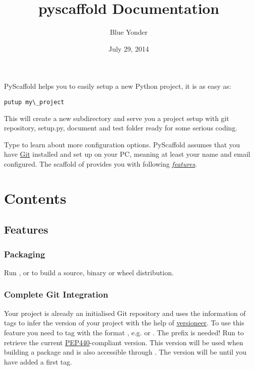 \documentclass[letterpaper,10pt,english]{sphinxmanual}
\title{pyscaffold Documentation}
\date{July 29, 2014}
\author{Blue Yonder}
\begin{document}
\maketitle
\tableofcontents
{}\label{index::doc}


PyScaffold helps you to easily setup a new Python project, it is as easy as:

\begin{Verbatim}[commandchars=\\\{\}]
putup my\_project
\end{Verbatim}

This will create a new subdirectory  and serve you a project
setup with git repository, setup.py, document and test folder ready for some
serious coding.

Type  to learn about more configuration options. PyScaffold assumes
that you have \href{http://git-scm.com/}{Git} installed and set up on your PC,
meaning at least your name and email configured.
The scaffold of  provides you with following
{\hyperref[features:features]{\emph{features}}}.


\chapter{Contents}
\label{index:pyscaffold}\label{index:contents}

\section{Features}
\label{features::doc}\label{features:features}\label{features:id1}

\subsection{Packaging}
\label{features:packaging}
Run ,  or
 to build a source, binary or wheel
distribution.


\subsection{Complete Git Integration}
\label{features:complete-git-integration}
Your project is already an initialised Git repository and  uses
the information of tags to infer the version of your project with the help of
\href{https://github.com/warner/python-versioneer}{versioneer}.
To use this feature you need to tag with the format 
, e.g.  or . The prefix  is needed!
Run  to retrieve the current \href{http://www.python.org/dev/peps/pep-0440/}{PEP440}-compliant version. This version
will be used when building a package and is also accessible through
.
The version will be  until you have added a first tag.
\end{document}
